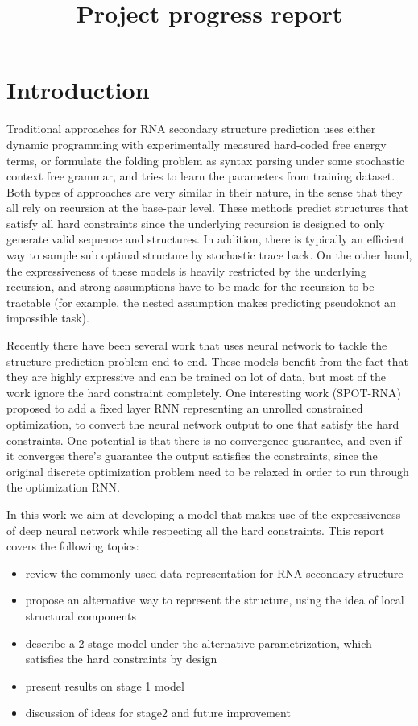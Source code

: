 \documentclass[12pt]{article}
\title{Project progress report}
\begin{document}
\maketitle


\section{Introduction}

Traditional approaches for RNA secondary structure prediction uses either dynamic programming
with experimentally measured hard-coded free energy terms,
or formulate the folding problem as syntax parsing under some stochastic context free grammar,
and tries to learn the parameters from training dataset.
Both types of approaches are very similar in their nature, in the sense that
they all rely on recursion at the base-pair level.
These methods predict structures that satisfy all hard constraints since the
underlying recursion is designed to only generate valid sequence and structures.
In addition, there is typically an efficient way to sample sub optimal structure by
stochastic trace back.
On the other hand, the expressiveness of these models is heavily restricted by the underlying
recursion, and strong assumptions have to be made for the recursion to be tractable
(for example, the nested assumption makes predicting pseudoknot an impossible task).

Recently there have been several work that uses neural network to tackle the structure prediction
problem end-to-end. These models benefit from the fact that they are highly expressive and can be trained on lot of data,
but most of the work ignore the hard constraint completely.
One interesting work (SPOT-RNA) proposed to add a fixed layer RNN representing an unrolled
constrained optimization, to convert the neural network output to one that satisfy the hard constraints.
One potential is that there is no convergence guarantee, and even if it converges there's guarantee the output satisfies the constraints,
since the original discrete optimization problem need to be relaxed in order to run through the optimization RNN.


In this work we aim at developing a model that makes use of the expressiveness of deep neural network
while respecting all the hard constraints. This report covers the following topics:

\begin{itemize}
    \item review the commonly used data representation for RNA secondary structure
    \item propose an alternative way to represent the structure, using the idea of local structural components
    \item describe a 2-stage model under the alternative parametrization,
which satisfies the hard constraints by design
    \item present results on stage 1 model
    \item discussion of ideas for stage2 and future improvement
\end{itemize}
\end{document}
